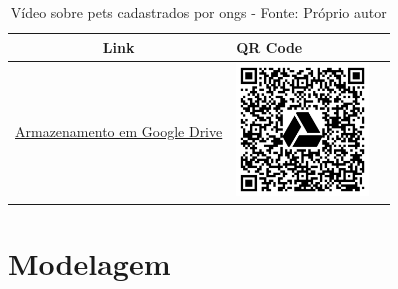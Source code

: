 \begin{table}[htbp]
\centering
\renewcommand{\arraystretch}{1.5}
\begin{tabular}{|c|>{\centering\arraybackslash}m{6cm}|c|}
\hline
\textbf{Link} & \textbf{QR Code} \\
\hline
\href{https://drive.google.com/file/d/1dkYJRDHbpXpmBwEDp8kkl79o4_4MUrHC/view?usp=drive_link}{Armazenamento em Google Drive} & \includegraphics[width=3.5cm]{arquivos/ImgLinks/PetsPorOngs.png} \\
\hline
\end{tabular}
\caption*{Vídeo sobre pets cadastrados por ongs - Fonte: Próprio autor}
\end{table}

\newpage
\chapter{Modelagem}

